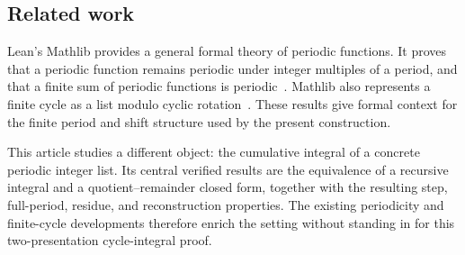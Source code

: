 \subsection{Related work}

Lean's Mathlib provides a general formal theory of periodic functions. It
proves that a periodic function remains periodic under integer multiples of a
period, and that a finite sum of periodic functions is periodic~\cite{leanmathlibperiodic}.
Mathlib also represents a finite cycle as a list modulo cyclic
rotation~\cite{leanmathlibcycles}. These results give formal context for the
finite period and shift structure used by the present construction.

This article studies a different object: the cumulative integral of a
concrete periodic integer list. Its central verified results are the
equivalence of a recursive integral and a quotient--remainder closed form,
together with the resulting step, full-period, residue, and reconstruction
properties. The existing periodicity and finite-cycle developments therefore
enrich the setting without standing in for this two-presentation
cycle-integral proof.
